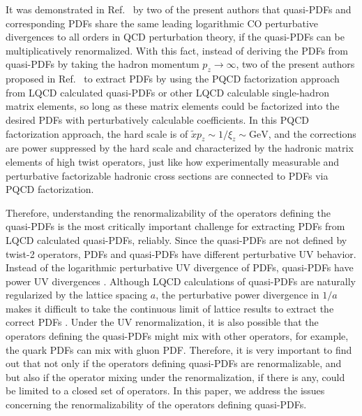 It was demonstrated in Ref.~\cite{Ma:2014jla} by two of the present authors that quasi-PDFs and corresponding PDFs share the same leading logarithmic CO perturbative divergences to all orders in QCD perturbation theory, if the quasi-PDFs can be multiplicatively renormalized.  With this fact, instead of deriving the PDFs from quasi-PDFs by taking the hadron momentum $p_z\to\infty$, two of the present authors proposed in Ref.~\cite{Ma:2014jla} to extract PDFs by using the PQCD factorization approach from LQCD calculated quasi-PDFs or other LQCD calculable single-hadron matrix elements, so long as these matrix elements could be factorized into the desired PDFs with perturbatively calculable coefficients.  In this PQCD factorization approach, the hard scale is of $\tilde{x}p_z \sim 1/\xi_z \sim \text{GeV}$, and the corrections are power suppressed by the hard scale and characterized by the hadronic matrix elements of high twist operators, just like how experimentally measurable and perturbative factorizable hadronic cross sections are connected to PDFs via PQCD factorization.

Therefore, understanding the renormalizability of the operators defining the quasi-PDFs is the most critically important challenge for extracting PDFs from LQCD calculated quasi-PDFs, reliably.  Since the quasi-PDFs are not defined by twist-2 operators, PDFs and quasi-PDFs have different perturbative UV behavior.  Instead of the logarithmic perturbative UV divergence of PDFs, quasi-PDFs have power UV divergences \cite{Ma:2014jla,Xiong:2013bka}.  Although LQCD calculations of quasi-PDFs are naturally regularized by the lattice spacing $a$, the perturbative power divergence in $1/a$ makes it difficult to take the continuous limit of lattice results to extract the correct PDFs \cite{Ishikawa:2016znu,Chen:2016fxx,Monahan:2016bvm,Alexandrou:2017huk, Chen:2017mzz}.  Under the UV renormalization, it is also possible that the operators defining the quasi-PDFs might mix with other operators, for example, the quark PDFs can mix with gluon PDF.  Therefore, it is very important to find out that not only if the operators defining quasi-PDFs are renormalizable, and but also if the operator mixing under the renormalization, if there is any, could be limited to a closed set of operators.  In this paper, we address the issues concerning the renormalizability of the operators defining quasi-PDFs.


